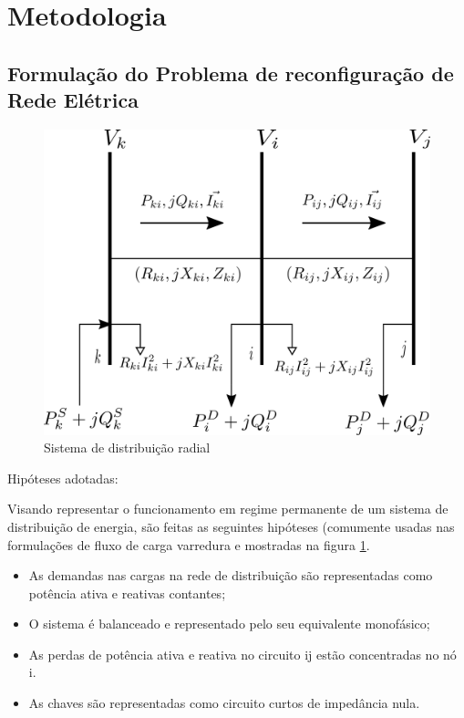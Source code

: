 \section{Metodologia}

\subsection{Formulação do Problema de reconfiguração de Rede Elétrica}

\begin{figure}[h]
    \centering
    \includegraphics[]{01img/diagrama.png}
    \caption{Sistema de distribuição radial}
    \label{SDR}

\end{figure}

Hipóteses adotadas:

Visando representar o funcionamento em regime permanente de um sistema de distribuição de energia, são feitas as seguintes hipóteses (comumente usadas nas formulações de fluxo de carga varredura \cite{ShirmohammadiANetworks} e mostradas na figura \ref{SDR}.

\begin{itemize}
    \item As demandas nas cargas na rede de distribuição são representadas como potência ativa e reativas contantes;
    
    \item O sistema é balanceado e representado pelo seu equivalente monofásico;
    
    \item As perdas de potência ativa e reativa no circuito ij estão concentradas no nó i.
    
    \item As chaves são representadas como circuito curtos de impedância nula.
\end{itemize}

